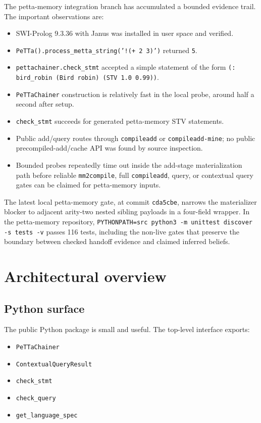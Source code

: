 \documentclass[11pt]{article}
\newcommand{\code}[1]{\texttt{#1}}
\begin{document}
The petta-memory integration branch has accumulated a bounded evidence trail.
The important observations are:
\begin{itemize}
  \item SWI-Prolog 9.3.36 with Janus was installed in user space and verified.
  \item \code{PeTTa().process\_metta\_string('!(+ 2 3)')} returned \code{5}.
  \item \code{pettachainer.check\_stmt} accepted a simple statement of the form
  \code{(: bird\_robin (Bird robin) (STV 1.0 0.99))}.
  \item \code{PeTTaChainer} construction is relatively fast in the local probe,
  around half a second after setup.
  \item \code{check\_stmt} succeeds for generated petta-memory STV statements.
  \item Public add/query routes through \code{compileadd} or
  \code{compileadd-mine}; no public precompiled-add/cache API was found by
  source inspection.
  \item Bounded probes repeatedly time out inside the add-stage materialization
  path before reliable \code{mm2compile}, full \code{compileadd}, query, or
  contextual query gates can be claimed for petta-memory inputs.
\end{itemize}

The latest local petta-memory gate, at commit \code{cda5cbe}, narrows the
materializer blocker to adjacent arity-two nested sibling payloads in a
four-field wrapper.  In the petta-memory repository, \code{PYTHONPATH=src
python3 -m unittest discover -s tests -v} passes 116 tests, including the
non-live gates that preserve the boundary between checked handoff evidence and
claimed inferred beliefs.

\section{Architectural overview}

\subsection{Python surface}

The public Python package is small and useful.  The top-level interface exports:
\begin{itemize}
  \item \code{PeTTaChainer}
  \item \code{ContextualQueryResult}
  \item \code{check\_stmt}
  \item \code{check\_query}
  \item \code{get\_language\_spec}
\end{itemize}
\end{document}
